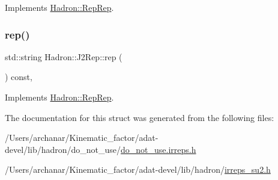 Implements \mbox{\hyperlink{structHadron_1_1RepRep_ab3213025f6de249f7095892109575fde}{Hadron\+::\+Rep\+Rep}}.

\mbox{\label{structHadron_1_1J2Rep_ae377be8f84efb218c8a07db0d4d5bb01}} 
\subsubsection{\texorpdfstring{rep()}{rep()}\hspace{0.1cm}{\footnotesize\ttfamily [5/5]}}
{\footnotesize\ttfamily std\+::string Hadron\+::\+J2\+Rep\+::rep (\begin{DoxyParamCaption}{ }\end{DoxyParamCaption}) const\hspace{0.3cm}{\ttfamily [inline]}, {\ttfamily [virtual]}}



Implements \mbox{\hyperlink{structHadron_1_1RepRep_ab3213025f6de249f7095892109575fde}{Hadron\+::\+Rep\+Rep}}.



The documentation for this struct was generated from the following files\+:\begin{DoxyCompactItemize}
\item 
/\+Users/archanar/\+Kinematic\+\_\+factor/adat-\/devel/lib/hadron/do\+\_\+not\+\_\+use/\mbox{\hyperlink{adat-devel_2lib_2hadron_2do__not__use_2do__not__use_8irreps_8h}{do\+\_\+not\+\_\+use.\+irreps.\+h}}\item 
/\+Users/archanar/\+Kinematic\+\_\+factor/adat-\/devel/lib/hadron/\mbox{\hyperlink{adat-devel_2lib_2hadron_2irreps__su2_8h}{irreps\+\_\+su2.\+h}}\end{DoxyCompactItemize}
